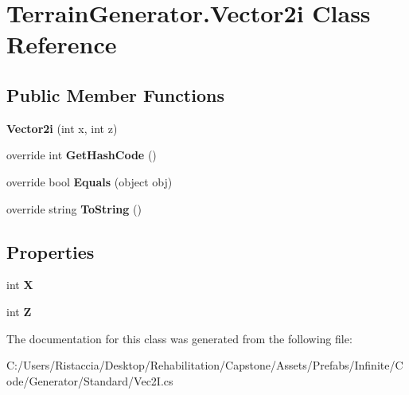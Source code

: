 \hypertarget{class_terrain_generator_1_1_vector2i}{}\section{Terrain\+Generator.\+Vector2i Class Reference}
\label{class_terrain_generator_1_1_vector2i}
\subsection*{Public Member Functions}
\begin{DoxyCompactItemize}
\item 
\mbox{\label{class_terrain_generator_1_1_vector2i_a921bb91ee49dac3ac26e1f7098690f94}} 
{\bfseries Vector2i} (int x, int z)
\item 
\mbox{\label{class_terrain_generator_1_1_vector2i_aa49b1c888e21f62d75f97284a6df4a6b}} 
override int {\bfseries Get\+Hash\+Code} ()
\item 
\mbox{\label{class_terrain_generator_1_1_vector2i_a6a2f057d7daadf113372d57c8b4349ca}} 
override bool {\bfseries Equals} (object obj)
\item 
\mbox{\label{class_terrain_generator_1_1_vector2i_ac28af96577055f7108e857edae3d694e}} 
override string {\bfseries To\+String} ()
\end{DoxyCompactItemize}
\subsection*{Properties}
\begin{DoxyCompactItemize}
\item 
\mbox{\label{class_terrain_generator_1_1_vector2i_a7e594a1075990cd1f2acb4d49277e201}} 
int {\bfseries X}
\item 
\mbox{\label{class_terrain_generator_1_1_vector2i_a16baa85586857fe6e4c876d2600b4a2b}} 
int {\bfseries Z}
\end{DoxyCompactItemize}


The documentation for this class was generated from the following file\+:\begin{DoxyCompactItemize}
\item 
C\+:/\+Users/\+Ristaccia/\+Desktop/\+Rehabilitation/\+Capstone/\+Assets/\+Prefabs/\+Infinite/\+Code/\+Generator/\+Standard/Vec2\+I.\+cs\end{DoxyCompactItemize}
